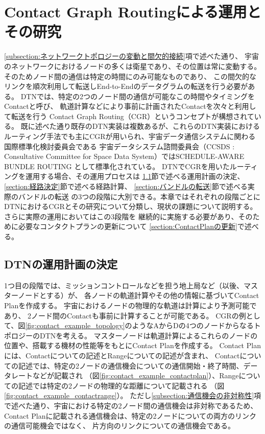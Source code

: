 \chapter{Contact Graph Routingによる運用とその研究}
\label{chap:DTNにおけるルーティングの研究と課題}

\ref{subsection:ネットワークトポロジーの変動と間欠的接続}項で述べた通り、
宇宙のネットワークにおけるノードの多くは衛星であり、その位置は常に変動する。
そのためノード間の通信は特定の時間にのみ可能なものであり、
この間欠的なリンクを順次利用して転送しEnd-to-Endのデータグラムの転送を行う必要がある。
DTNでは、特定の2つのノード間の通信が可能なこの時間やタイミングをContactと呼び、
軌道計算などにより事前に計画されたContactを次々と利用して転送を行う
Contact Graph Routing（CGR）\cite{Fraire2021}というコンセプトが構想されている。
既に述べた通り既存のDTN実装は複数あるが、これらのDTN実装における
ルーティング手法でも主にCGRが用いられ、宇宙データ通信システムに関わる国際標準化検討委員会である
宇宙データシステム諮問委員会（CCSDS : Consultative Committee 
for Space Data System）ではSCHEDULE-AWARE BUNDLE ROUTING
\cite{schedule_aware_bundle_routing}として標準化されている。
DTNでCGRを用いたルーティングを運用する場合、その運用プロセスは
\ref{section:運用計画の決定}節で述べる運用計画の決定、
\ref{section:経路決定}節で述べる経路計算、
\ref{section:バンドルの転送}節で述べる実際のバンドルの転送
の3つの段階に大別できる。本章ではそれぞれの段階ごとに
DTNにおけるCGRとその研究について分類し、現状の課題について説明する。
さらに実際の運用においてはこの3段階を
継続的に実施する必要があり、そのために必要なコンタクトプランの更新について
\ref{section:ContactPlanの更新}で述べる。


\section{DTNの運用計画の決定}
\label{section:運用計画の決定}
1つ目の段階では、ミッションコントロールなどを担う地上局など（以後、マスターノードとする）が、
各ノードの軌道計算やその他の情報に基づいてContact Planを作成する。
宇宙におけるノードの物理的な軌道は計算により予測可能であり、
2ノード間のContactも事前に計算することが可能である。 
CGRの例として、図\ref{fig:contact_example_topology}のようなAからDの4つのノードからなるトポロジーのDTNを考える。
マスターノードは軌道計算によるこれらのノードの位置や、搭載する機材の性能等をもとにContact Planを作成する。
Contact Planには、Contactについての記述とRangeについての記述が含まれ、
Contactについての記述では、特定の2ノードの通信機会についての通信開始・終了時間、データレートなどが記載され
（図\ref{fig:contact_example_contactplan}）、Rangeについての記述では特定の2ノードの物理的な距離について記載される
（図\ref{fig:contact_example_contactrange}）。
ただし\ref{subsection:通信機会の非対称性}項で述べた通り、宇宙における特定の2ノード間の通信機会は非対称であるため、
Contact Planに記載される通信機会は、特定の2ノードについての両方のリンクの通信可能機会ではなく、
片方向のリンクについての通信機会である。


